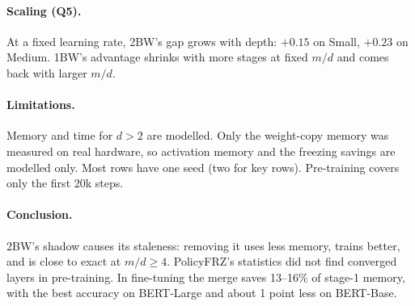 \documentclass[10pt,twocolumn]{article}
\begin{document}
\paragraph{Scaling (Q5).} At a fixed learning rate, 2BW's gap grows with depth: $+0.15$ on
Small, $+0.23$ on Medium. 1BW's advantage shrinks with more stages at fixed $m/d$ and comes back
with larger $m/d$.

\paragraph{Limitations.} Memory and time for $d{>}2$ are modelled. Only the weight-copy memory
was measured on real hardware, so activation memory and the freezing savings are modelled only.
Most rows have one seed (two for key rows). Pre-training covers only the first 20k steps.

\paragraph{Conclusion.} 2BW's shadow causes its staleness: removing it uses less memory, trains
better, and is close to exact at $m/d\ge4$. PolicyFRZ's statistics did not find converged layers
in pre-training. In fine-tuning the merge saves 13--16\% of stage-1
memory, with the best accuracy on BERT-Large and about 1 point less on BERT-Base.

\label{lastbodypage}
\end{document}
